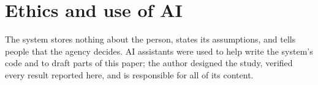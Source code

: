\documentclass[11pt]{article}
\begin{document}
\section*{Ethics and use of AI}
The system stores nothing about the person, states its assumptions, and tells people that the agency decides. AI assistants were used to help write the system's code and to draft parts of this paper; the author designed the study, verified every result reported here, and is responsible for all of its content.



\end{document}
